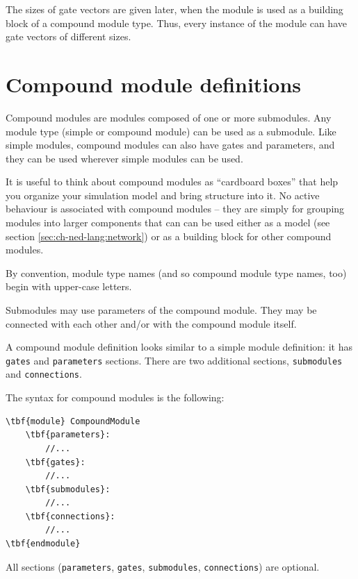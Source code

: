 The sizes of gate vectors are given later, when the module is used as
a building block of a compound module type. Thus, every instance of
the module can have gate vectors of different sizes.





\section{Compound module definitions}


Compound modules are modules composed of one or more submodules.
Any module type (simple or compound module) can be used as a submodule.
Like simple modules, compound modules can also have gates and parameters,
and they can be used wherever simple modules can be used.

It is useful to think about compound modules as ``cardboard boxes''
that help you organize your simulation model and bring structure into
it. No active behaviour is associated with compound modules -- they
are simply for grouping modules into larger components that can
can be used either as a model (see section \ref{sec:ch-ned-lang:network})
or as a building block for other compound modules.

By convention, module type names (and so compound module type names, too)
begin with upper-case letters.

Submodules may use parameters of the compound module.
They may be connected with each other and/or with
the compound module itself.

A compound module definition looks
similar to a simple module definition:
it has \texttt{gates} and \texttt{parameters} sections.
There are two additional sections, \texttt{submodules} and
\texttt{connections}.

The syntax for compound modules is the following:

\begin{Verbatim}[commandchars=\\\{\}]
\tbf{module} CompoundModule
    \tbf{parameters}:
        //...
    \tbf{gates}:
        //...
    \tbf{submodules}:
        //...
    \tbf{connections}:
        //...
\tbf{endmodule}
\end{Verbatim}

All sections (\texttt{parameters}, \texttt{gates}, \texttt{submodules},
\texttt{connections}) are optional.




